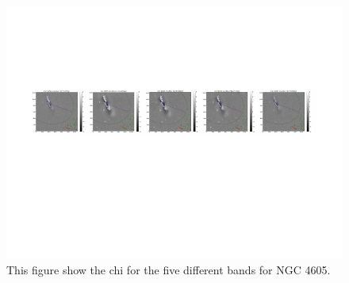 \documentclass[12pt,preprint,pdftex]{aastex}
\begin{document}
\begin{figure}
\centering
\includegraphics[trim = .9cm 4.5cm 0cm 2.9cm,clip=true,width=\textwidth] {goodsingle-colors-chi.pdf}
\caption{This figure show the chi for the five different bands for NGC 4605.}
\label{fig:colorschi}
\end{figure}
\end{document}
